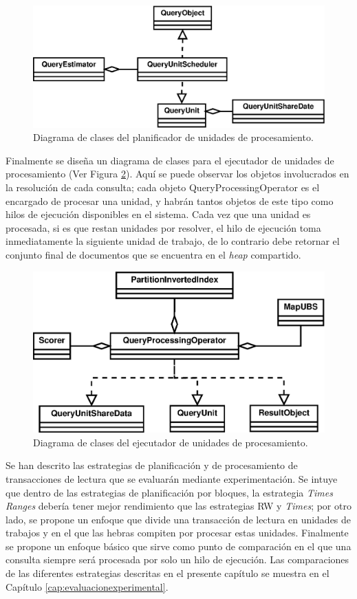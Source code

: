 \begin{figure}[!th]
\centering
\includegraphics[scale=.75]{images/QueryUnitScheduler.eps}
\caption{Diagrama de clases del planificador de unidades de procesamiento.}
\label{fig:queryunit_scheduler}
\end{figure}


Finalmente se diseña un diagrama de clases para el ejecutador de unidades de procesamiento (Ver Figura \ref{fig:queryunit_executer}). Aquí se puede observar los objetos involucrados en la resolución de cada consulta; cada objeto QueryProcessingOperator es el encargado de procesar una unidad, y habrán tantos objetos de este tipo como hilos de ejecución disponibles en el sistema. Cada vez que una unidad es procesada, si es que restan unidades por resolver, el hilo de ejecución toma inmediatamente la siguiente unidad de trabajo, de lo contrario debe retornar el conjunto final de documentos que se encuentra en el \textit{heap} compartido. 

\begin{figure}[!th]
\centering
\includegraphics[scale=.75]{images/QueryUnitExecuter.eps}
\caption{Diagrama de clases del ejecutador de unidades de procesamiento.}
\label{fig:queryunit_executer}
\end{figure}


Se han descrito las estrategias de planificación y de procesamiento de transacciones de lectura que se evaluarán mediante experimentación. Se intuye que dentro de las estrategias de planificación por bloques, la estrategia \textit{Times Ranges} debería tener mejor rendimiento que las estrategias RW y \textit{Times}; por otro lado, se propone un enfoque que divide una transacción de lectura en unidades de trabajos y en el que las hebras compiten por procesar estas unidades. Finalmente se propone un enfoque básico que sirve como punto de comparación en el que una consulta siempre será procesada por solo un hilo de ejecución. Las comparaciones de las diferentes estrategias descritas en el presente capítulo se muestra en el Capítulo \ref{cap:evaluacionexperimental}.